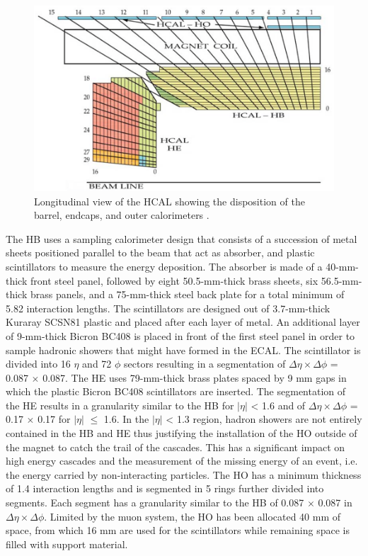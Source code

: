     \begin{figure}[t!]
      \centering
      \includegraphics[width=\textwidth]{img/I-3-cms/hcal.png}
      \caption{Longitudinal view of the HCAL showing the disposition of the barrel, endcaps, and outer calorimeters \cite{1748-0221-3-08-S08004}.}
      \label{fig:I-3-hcal}
    \end{figure}

    The HB uses a sampling calorimeter design that consists of a succession of metal sheets positioned parallel to the beam that act as absorber, and plastic scintillators to measure the energy deposition. The absorber is made of a 40-mm-thick front steel panel, followed by eight 50.5-mm-thick brass sheets, six 56.5-mm-thick brass panels, and a 75-mm-thick steel back plate for a total minimum of 5.82 interaction lengths. The scintillators are designed out of 3.7-mm-thick Kuraray SCSN81 plastic and placed after each layer of metal. An additional layer of 9-mm-thick Bicron BC408 is placed in front of the first steel panel in order to sample hadronic showers that might have formed in the ECAL. The scintillator is divided into 16 $ \eta $ and 72 $ \phi $ sectors resulting in a segmentation of $ \Delta \eta \times \Delta \phi $ = 0.087 $ \times $ 0.087. The HE uses 79-mm-thick brass plates spaced by 9 mm gaps in which the plastic Bicron BC408 scintillators are inserted. The segmentation of the HE results in a granularity similar to the HB for $ | \eta | $ < 1.6 and of $ \Delta \eta \times \Delta \phi $ = 0.17 $ \times $ 0.17 for $ | \eta | $ $ \le $ 1.6. In the $ | \eta | $ < 1.3 region, hadron showers are not entirely contained in the HB and HE thus justifying the installation of the HO outside of the magnet to catch the trail of the cascades. This has a significant impact on high energy cascades and the measurement of the missing energy of an event, i.e. the energy carried by non-interacting particles. The HO has a minimum thickness of 1.4 interaction lengths and is segmented in 5 rings further divided into segments. Each segment has a granularity similar to the HB of 0.087 $ \times $ 0.087 in $ \Delta \eta \times \Delta \phi $. Limited by the muon system, the HO has been allocated 40 mm of space, from which 16 mm are used for the scintillators while remaining space is filled with support material. \\

